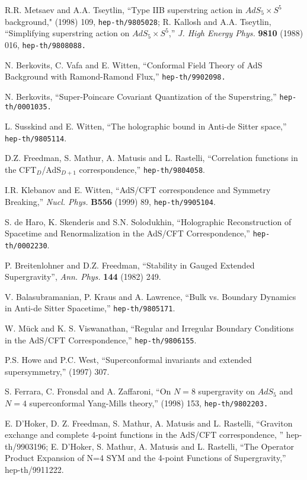 \begin{thebibliography}{99}
R.R. Metsaev  and  A.A. Tseytlin,
``Type IIB superstring action in
 $AdS_5 \times S^5$ background,"
 (1998) 109, {\tt hep-th/9805028};
R. Kallosh and A.A. Tseytlin, ``Simplifying
    superstring action on $AdS_5\times S^5$,''
    {\em J. High Energy Phys.} {\bf 9810} (1988) 016,
{\tt hep-th/9808088.}

N. Berkovits, C. Vafa and E. Witten,
``Conformal Field Theory of AdS Background with Ramond-Ramond Flux,''
{\tt hep-th/9902098.}

N. Berkovits,
``Super-Poincare Covariant Quantization of the Superstring,''
{\tt hep-th/0001035.}

L. Susskind and E. Witten, ``The holographic bound in Anti-de Sitter
space,'' {{\tt hep-th/9805114}}.

D.Z. Freedman, S. Mathur, A. Matusis and L. Rastelli,
``Correlation functions in the CFT$_D$/AdS$_{D+1}$ correspondence,''
{{\tt hep-th/9804058}}.

I.R. Klebanov and E. Witten,
``AdS/CFT correspondence and Symmetry Breaking,''
{\em Nucl. Phys.} {\bf B556} (1999) 89,
{{\tt hep-th/9905104}}.

S. de Haro, K. Skenderis and S.N. Solodukhin,
``Holographic Reconstruction of Spacetime and Renormalization in the AdS/CFT
Correspondence,'' {{\tt hep-th/0002230}}.

P. Breitenlohner and D.Z. Freedman,
``Stability in Gauged Extended Supergravity'',
{\it Ann. Phys.} {\bf 144} (1982) 249.

V. Balasubramanian, P. Kraus and A. Lawrence,
``Bulk vs. Boundary Dynamics in Anti-de Sitter Spacetime,''
{{\tt hep-th/9805171}}.


W. M\" uck and K. S. Viswanathan, ``Regular and Irregular Boundary
Conditions in the AdS/CFT Correspondence,''
{{\tt hep-th/9806155}}.


P.S. Howe and P.C. West,
``Superconformal invariants and extended supersymmetry,''
 (1997) 307.
 
S. Ferrara, C. Fronsdal and A. Zaffaroni,
``On $N=8$ supergravity on $AdS_5$ and $N=4$ superconformal Yang-Mills
theory,''
 (1998) 153, {\tt hep-th/9802203.}

E. D'Hoker, D. Z. Freedman, S. Mathur, A. Matusis and L. Rastelli,
``Graviton exchange and complete 4-point functions in the AdS/CFT
correspondence, ''
hep-th/9903196;
E. D'Hoker, S. Mathur, A. Matusis and L. Rastelli,
``The Operator Product Expansion of N=4 SYM 
and the 4-point Functions of Supergravity,''
hep-th/9911222.


\end{thebibliography}

